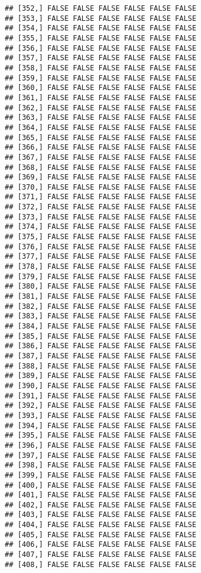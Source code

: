 \documentclass[
]{article}
\begin{document}
\begin{verbatim}
## [352,] FALSE FALSE FALSE FALSE FALSE FALSE
## [353,] FALSE FALSE FALSE FALSE FALSE FALSE
## [354,] FALSE FALSE FALSE FALSE FALSE FALSE
## [355,] FALSE FALSE FALSE FALSE FALSE FALSE
## [356,] FALSE FALSE FALSE FALSE FALSE FALSE
## [357,] FALSE FALSE FALSE FALSE FALSE FALSE
## [358,] FALSE FALSE FALSE FALSE FALSE FALSE
## [359,] FALSE FALSE FALSE FALSE FALSE FALSE
## [360,] FALSE FALSE FALSE FALSE FALSE FALSE
## [361,] FALSE FALSE FALSE FALSE FALSE FALSE
## [362,] FALSE FALSE FALSE FALSE FALSE FALSE
## [363,] FALSE FALSE FALSE FALSE FALSE FALSE
## [364,] FALSE FALSE FALSE FALSE FALSE FALSE
## [365,] FALSE FALSE FALSE FALSE FALSE FALSE
## [366,] FALSE FALSE FALSE FALSE FALSE FALSE
## [367,] FALSE FALSE FALSE FALSE FALSE FALSE
## [368,] FALSE FALSE FALSE FALSE FALSE FALSE
## [369,] FALSE FALSE FALSE FALSE FALSE FALSE
## [370,] FALSE FALSE FALSE FALSE FALSE FALSE
## [371,] FALSE FALSE FALSE FALSE FALSE FALSE
## [372,] FALSE FALSE FALSE FALSE FALSE FALSE
## [373,] FALSE FALSE FALSE FALSE FALSE FALSE
## [374,] FALSE FALSE FALSE FALSE FALSE FALSE
## [375,] FALSE FALSE FALSE FALSE FALSE FALSE
## [376,] FALSE FALSE FALSE FALSE FALSE FALSE
## [377,] FALSE FALSE FALSE FALSE FALSE FALSE
## [378,] FALSE FALSE FALSE FALSE FALSE FALSE
## [379,] FALSE FALSE FALSE FALSE FALSE FALSE
## [380,] FALSE FALSE FALSE FALSE FALSE FALSE
## [381,] FALSE FALSE FALSE FALSE FALSE FALSE
## [382,] FALSE FALSE FALSE FALSE FALSE FALSE
## [383,] FALSE FALSE FALSE FALSE FALSE FALSE
## [384,] FALSE FALSE FALSE FALSE FALSE FALSE
## [385,] FALSE FALSE FALSE FALSE FALSE FALSE
## [386,] FALSE FALSE FALSE FALSE FALSE FALSE
## [387,] FALSE FALSE FALSE FALSE FALSE FALSE
## [388,] FALSE FALSE FALSE FALSE FALSE FALSE
## [389,] FALSE FALSE FALSE FALSE FALSE FALSE
## [390,] FALSE FALSE FALSE FALSE FALSE FALSE
## [391,] FALSE FALSE FALSE FALSE FALSE FALSE
## [392,] FALSE FALSE FALSE FALSE FALSE FALSE
## [393,] FALSE FALSE FALSE FALSE FALSE FALSE
## [394,] FALSE FALSE FALSE FALSE FALSE FALSE
## [395,] FALSE FALSE FALSE FALSE FALSE FALSE
## [396,] FALSE FALSE FALSE FALSE FALSE FALSE
## [397,] FALSE FALSE FALSE FALSE FALSE FALSE
## [398,] FALSE FALSE FALSE FALSE FALSE FALSE
## [399,] FALSE FALSE FALSE FALSE FALSE FALSE
## [400,] FALSE FALSE FALSE FALSE FALSE FALSE
## [401,] FALSE FALSE FALSE FALSE FALSE FALSE
## [402,] FALSE FALSE FALSE FALSE FALSE FALSE
## [403,] FALSE FALSE FALSE FALSE FALSE FALSE
## [404,] FALSE FALSE FALSE FALSE FALSE FALSE
## [405,] FALSE FALSE FALSE FALSE FALSE FALSE
## [406,] FALSE FALSE FALSE FALSE FALSE FALSE
## [407,] FALSE FALSE FALSE FALSE FALSE FALSE
## [408,] FALSE FALSE FALSE FALSE FALSE FALSE

\end{verbatim}
\end{document}
